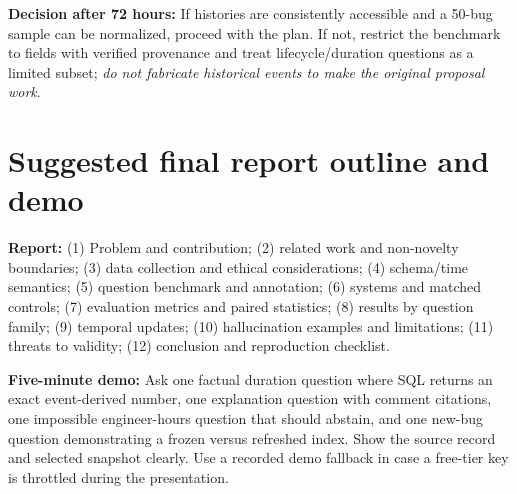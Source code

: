 \documentclass[11pt,a4paper]{article}
\begin{document}
\begin{keybox}
\textbf{Decision after 72 hours:} If histories are consistently accessible and a 50-bug sample can be normalized, proceed with the plan. If not, restrict the benchmark to fields with verified provenance and treat lifecycle/duration questions as a limited subset; \emph{do not fabricate historical events to make the original proposal work}.
\end{keybox}

\section{Suggested final report outline and demo}
\textbf{Report:} (1) Problem and contribution; (2) related work and non-novelty boundaries; (3) data collection and ethical considerations; (4) schema/time semantics; (5) question benchmark and annotation; (6) systems and matched controls; (7) evaluation metrics and paired statistics; (8) results by question family; (9) temporal updates; (10) hallucination examples and limitations; (11) threats to validity; (12) conclusion and reproduction checklist.

\textbf{Five-minute demo:} Ask one factual duration question where SQL returns an exact event-derived number, one explanation question with comment citations, one impossible engineer-hours question that should abstain, and one new-bug question demonstrating a frozen versus refreshed index. Show the source record and selected snapshot clearly. Use a recorded demo fallback in case a free-tier key is throttled during the presentation.
\end{document}
